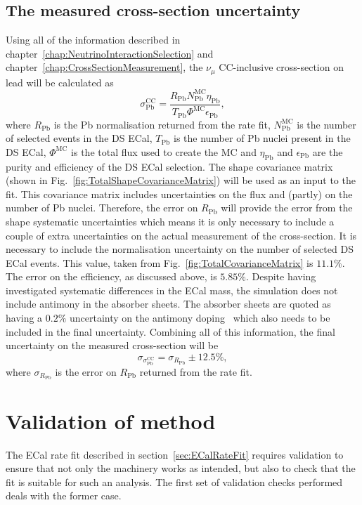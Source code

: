 \subsection{The measured cross-section uncertainty}
Using all of the information described in chapter~\ref{chap:NeutrinoInteractionSelection} and chapter~\ref{chap:CrossSectionMeasurement}, the $\nu_\mu$ CC-inclusive cross-section on lead will be calculated as
\begin{equation}
\label{eq:CrossSection}
\sigma^{\textrm{CC}}_{\textrm{Pb}} = \frac{R_{\textrm{Pb}}N^{\textrm{MC}}_{\textrm{Pb}}\eta_{\textrm{Pb}}}{T_{\textrm{Pb}}\Phi^{\textrm{MC}}\epsilon_{\textrm{Pb}}},
\end{equation}
where $R_{\textrm{Pb}}$ is the Pb normalisation returned from the rate fit, $N^{\textrm{MC}}_{\textrm{Pb}}$ is the number of selected events in the DS ECal, $T_{\textrm{Pb}}$ is the number of Pb nuclei present in the DS ECal, $\Phi^{\textrm{MC}}$ is the total flux used to create the MC and $\eta_{\textrm{Pb}}$ and $\epsilon_{\textrm{Pb}}$ are the purity and efficiency of the DS ECal selection.  The shape covariance matrix (shown in Fig.~\ref{fig:TotalShapeCovarianceMatrix}) will be used as an input to the fit.  This covariance matrix includes uncertainties on the flux and (partly) on the number of Pb nuclei.  Therefore, the error on $R_{\textrm{Pb}}$ will provide the error from the shape systematic uncertainties which means it is only necessary to include a couple of extra uncertainties on the actual measurement of the cross-section.  It is necessary to include the normalisation uncertainty on the number of selected DS ECal events.  This value, taken from Fig.~\ref{fig:TotalCovarianceMatrix} is $11.1\%$.  The error on the efficiency, as discussed above, is $5.85\%$. Despite having investigated systematic differences in the ECal mass, the simulation does not include antimony in the absorber sheets.  The absorber sheets are quoted as having a $0.2\%$ uncertainty on the antimony doping~\cite{1748-0221-8-10-P10019} which also needs to be included in the final uncertainty.  Combining all of this information, the final uncertainty on the measured cross-section will be
\begin{equation}
\label{eq:CrossSectionUncertainty}
\sigma_{\sigma^{\textrm{CC}}_{\textrm{Pb}}} = \sigma_{R_{\textrm{Pb}}} \pm 12.5\%,
\end{equation}
where $\sigma_{R_{\textrm{Pb}}}$ is the error on $R_{\textrm{Pb}}$ returned from the rate fit.

\section{Validation of method}
\label{sec:MethodValidation}
The ECal rate fit described in section~\ref{sec:ECalRateFit} requires validation to ensure that not only the machinery works as intended, but also to check that the fit is suitable for such an analysis.  The first set of validation checks performed deals with the former case.

